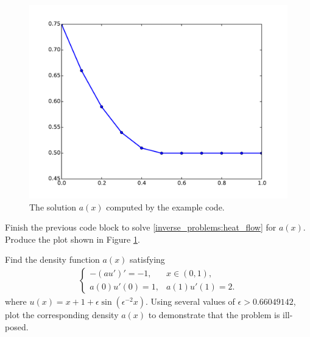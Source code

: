 \begin{figure}
\centering
\includegraphics[width=\textwidth]{density_a.pdf}
\caption{The solution $a(x)$ computed by the example code.}
\label{fig:inverse_problems:num1}
\end{figure}


\begin{problem}
	Finish the previous code block to solve \eqref{inverse_problems:heat_flow} for $a(x)$.
	Produce the plot shown in Figure \ref{fig:inverse_problems:num1}.
\end{problem}

\begin{problem}
	Find the density function $a(x)$ satisfying 
	\begin{align}
	\begin{cases}
		-(au')' = -1, & x \in (0,1),\\
		a(0)u'(0) = 1, & a(1)u'(1) = 2.
	\end{cases} \label{inverse_problems:ill_posed}
	\end{align}
	where $u(x) = x + 1 + \epsilon \sin(\epsilon^{-2}x)$.  Using several values of $\epsilon  > 0.66049142$, plot the corresponding density $a(x)$ to demonstrate that the problem is ill-posed.
\end{problem}

